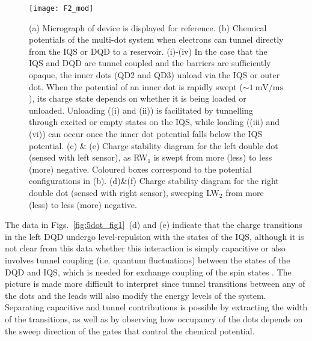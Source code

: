 \begin{figure}
\texttt{[image: F2\_mod]}
\caption{\label{fig:5dot_fig2} (a) Micrograph of device is displayed for reference. (b) Chemical potentials of the multi-dot system when electrons can tunnel directly from the IQS or DQD to a reservoir. (i)-(iv) In the case that the IQS and DQD are tunnel coupled and the barriers are sufficiently opaque, the inner dots (QD2 and QD3) unload via the IQS or outer dot. When the potential of an inner dot is rapidly swept ($\sim \SI{1}{\milli\volt\per\milli\second}$), its charge state depends on whether it is being loaded or unloaded. Unloading ((i) and (ii)) is facilitated by tunnelling through excited or empty states on the IQS, while loading ((iii) and (vi)) can occur once the inner dot potential falls below the IQS potential. (c) \& (e) Charge stability diagram for the left double dot (sensed with left sensor), as RW${_1}$ is swept from more (less) to less (more) negative. Coloured boxes correspond to the potential configurations in (b). (d)\&(f) Charge stability diagram for the right double dot (sensed with right sensor), sweeping LW${_2}$ from more (less) to less (more) negative.}
\end{figure}

The data in Figs.~\ref{fig:5dot_fig1}~(d) and (e) indicate that the charge transitions in the left DQD undergo level-repulsion with the states of the IQS, although it is not clear from this data whether this interaction is simply capacitive or also involves tunnel coupling (i.e. quantum fluctuations) between the states of the DQD and IQS, which is needed for exchange coupling of the spin states \cite{dassarma}. The picture is made more difficult to interpret since tunnel transitions between any of the dots and the leads  will also modify the energy levels of the system.  Separating capacitive and tunnel contributions is possible by extracting the width of the transitions, as well as by observing how occupancy of the dots depends on the sweep direction of the gates that control the chemical potential.

